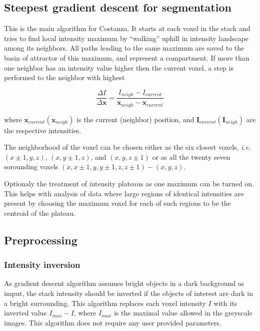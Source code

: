 \documentclass[a4paper,12pt]{article}
\begin{document}
\subsection{Steepest gradient descent for segmentation}

This is the main algorithm for Costanza. It starts at each voxel in the stack
and tries to find local intensity maximum by ``walking'' uphill in intensity landscape
among its neighbors. All paths leading to the same maximum are saved to the
basin of attractor of this maximum, and represent a compartment. If more than one neighbor
has an intensity value higher then the current voxel, a step is performed to
the neighbor with highest

\begin{equation}
\frac{\Delta I}{\Delta \mathbf{x}} =
\frac{I_{neigh}-I_{current}}{\mathbf{x}_{neigh}-\mathbf{x}_{current}}
\end{equation}

where $\mathbf{x}_{current}(\mathbf{x}_{neigh})$ is the current (neighbor)
position, and $\mathbf{I}_{current}(\mathbf{I}_{neigh})$ are the respective intensities.

The neighborhood of the voxel can be chosen either as the six closest voxels, 	\textit{i.e.}
$(x\pm1,y,z)$, $(x,y\pm1,z)$, and $(x,y,z\pm1)$ or as all the twenty seven sorounding voxels ${({x,x\pm1},{y,y\pm1},{z,z\pm1})}-(x,y,z)$.

Optionaly the treatment of intensity plateaus as one maximum can be turned on. This helps with analysis of data where large regions of identical intensities are present by choosing the maximum voxel for each of such regions to be the centroid of the plateau. 

\subsection{Preprocessing}

\subsubsection{Intensity inversion}

As gradient descent algorithm assumes bright objects in a dark background as imput, the stack intensity should be inverted if the objects of interest are dark in a bright surrounding. This
algorithm replaces each voxel intensity $I$ with its inverted value
$I_{max}-I$, where $I_{max}$ is the maximal value allowed in the
greyscale images. This algorithm does not require any user provided
parameters.
\end{document}
